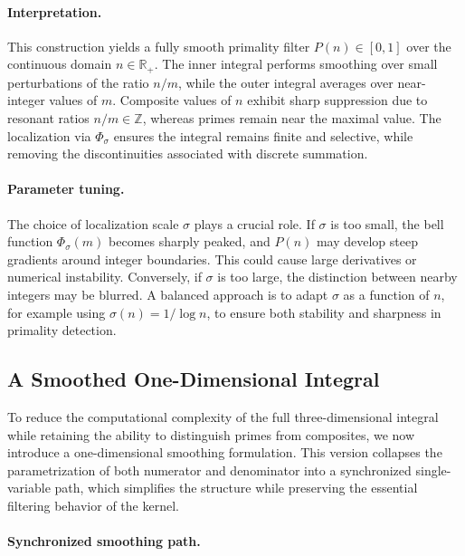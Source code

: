 \documentclass[12pt]{article}
\theoremstyle{definition}
\theoremstyle{plain}
\theoremstyle{remark}
\begin{document}
\paragraph{Interpretation.}

This construction yields a fully smooth primality filter \( P(n) \in [0,1] \) over the continuous domain \( n \in \mathbb{R}_+ \). The inner integral performs smoothing over small perturbations of the ratio \( n/m \), while the outer integral averages over near-integer values of \( m \). Composite values of \( n \) exhibit sharp suppression due to resonant ratios \( n/m \in \mathbb{Z} \), whereas primes remain near the maximal value. The localization via \( \Phi_\sigma \) ensures the integral remains finite and selective, while removing the discontinuities associated with discrete summation.

\paragraph{Parameter tuning.}

The choice of localization scale \( \sigma \) plays a crucial role. If \( \sigma \) is too small, the bell function \( \Phi_\sigma(m) \) becomes sharply peaked, and \( P(n) \) may develop steep gradients around integer boundaries. This could cause large derivatives or numerical instability. Conversely, if \( \sigma \) is too large, the distinction between nearby integers may be blurred. A balanced approach is to adapt \( \sigma \) as a function of \( n \), for example using \( \sigma(n) = 1/\log n \), to ensure both stability and sharpness in primality detection.

\subsection{A Smoothed One-Dimensional Integral}

To reduce the computational complexity of the full three-dimensional integral while retaining the ability to distinguish primes from composites, we now introduce a one-dimensional smoothing formulation. This version collapses the parametrization of both numerator and denominator into a synchronized single-variable path, which simplifies the structure while preserving the essential filtering behavior of the kernel.

\paragraph{Synchronized smoothing path.}
\end{document}
